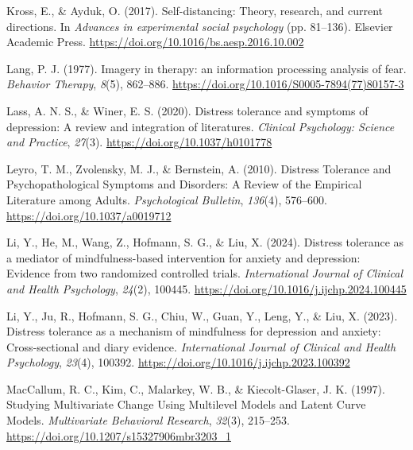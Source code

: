 \documentclass[
  man,floatsintext]{apa7}
\newlength{\cslhangindent}
\newlength{\cslentryspacingunit} %
\newenvironment{CSLReferences}[2] %
 {%
  \setlength{\parindent}{0pt}
  \ifodd #1
  \let\oldpar\par
  \def\par{\hangindent=\cslhangindent\oldpar}
  \fi
  \setlength{\parskip}{#2\cslentryspacingunit}
 }%
 {}
\begin{document}
\begin{CSLReferences}{1}{0}
\leavevmode{}%
Kross, E., \& Ayduk, O. (2017). Self-distancing: Theory, research, and current directions. In \emph{Advances in experimental social psychology} (pp. 81--136). Elsevier Academic Press. \url{https://doi.org/10.1016/bs.aesp.2016.10.002}

\leavevmode{}%
Lang, P. J. (1977). Imagery in therapy: an information processing analysis of fear. \emph{Behavior Therapy}, \emph{8}(5), 862--886. \url{https://doi.org/10.1016/S0005-7894(77)80157-3}

\leavevmode{}%
Lass, A. N. S., \& Winer, E. S. (2020). Distress tolerance and symptoms of depression: A review and integration of literatures. \emph{Clinical Psychology: Science and Practice}, \emph{27}(3). \url{https://doi.org/10.1037/h0101778}

\leavevmode{}%
Leyro, T. M., Zvolensky, M. J., \& Bernstein, A. (2010). Distress Tolerance and Psychopathological Symptoms and Disorders: A Review of the Empirical Literature among Adults. \emph{Psychological Bulletin}, \emph{136}(4), 576--600. \url{https://doi.org/10.1037/a0019712}

\leavevmode{}%
Li, Y., He, M., Wang, Z., Hofmann, S. G., \& Liu, X. (2024). Distress tolerance as a mediator of mindfulness-based intervention for anxiety and depression: Evidence from two randomized controlled trials. \emph{International Journal of Clinical and Health Psychology}, \emph{24}(2), 100445. \url{https://doi.org/10.1016/j.ijchp.2024.100445}

\leavevmode{}%
Li, Y., Ju, R., Hofmann, S. G., Chiu, W., Guan, Y., Leng, Y., \& Liu, X. (2023). Distress tolerance as a mechanism of mindfulness for depression and anxiety: Cross-sectional and diary evidence. \emph{International Journal of Clinical and Health Psychology}, \emph{23}(4), 100392. \url{https://doi.org/10.1016/j.ijchp.2023.100392}

\leavevmode{}%
MacCallum, R. C., Kim, C., Malarkey, W. B., \& Kiecolt-Glaser, J. K. (1997). Studying Multivariate Change Using Multilevel Models and Latent Curve Models. \emph{Multivariate Behavioral Research}, \emph{32}(3), 215--253. \url{https://doi.org/10.1207/s15327906mbr3203_1}


\end{CSLReferences}
\end{document}
